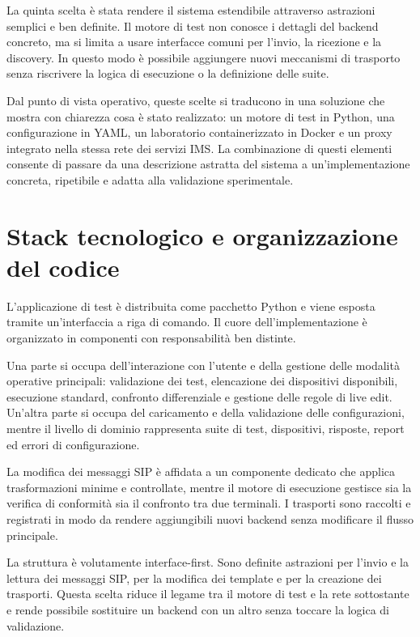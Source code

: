 La quinta scelta \`e stata rendere il sistema estendibile attraverso astrazioni semplici e ben definite. Il motore di test non conosce i dettagli del backend concreto, ma si limita a usare interfacce comuni per l'invio, la ricezione e la discovery. In questo modo \`e possibile aggiungere nuovi meccanismi di trasporto senza riscrivere la logica di esecuzione o la definizione delle suite.

Dal punto di vista operativo, queste scelte si traducono in una soluzione che mostra con chiarezza cosa \`e stato realizzato: un motore di test in Python, una configurazione in YAML, un laboratorio containerizzato in Docker e un proxy integrato nella stessa rete dei servizi IMS. La combinazione di questi elementi consente di passare da una descrizione astratta del sistema a un'implementazione concreta, ripetibile e adatta alla validazione sperimentale.

\section{Stack tecnologico e organizzazione del codice}

L'applicazione di test \`e distribuita come pacchetto Python e viene esposta tramite un'interfaccia a riga di comando. Il cuore dell'implementazione \`e organizzato in componenti con responsabilit\`a ben distinte.

Una parte si occupa dell'interazione con l'utente e della gestione delle modalit\`a operative principali: validazione dei test, elencazione dei dispositivi disponibili, esecuzione standard, confronto differenziale e gestione delle regole di live edit. Un'altra parte si occupa del caricamento e della validazione delle configurazioni, mentre il livello di dominio rappresenta suite di test, dispositivi, risposte, report ed errori di configurazione.

La modifica dei messaggi SIP \`e affidata a un componente dedicato che applica trasformazioni minime e controllate, mentre il motore di esecuzione gestisce sia la verifica di conformit\`a sia il confronto tra due terminali. I trasporti sono raccolti e registrati in modo da rendere aggiungibili nuovi backend senza modificare il flusso principale.

La struttura \`e volutamente interface-first. Sono definite astrazioni per l'invio e la lettura dei messaggi SIP, per la modifica dei template e per la creazione dei trasporti. Questa scelta riduce il legame tra il motore di test e la rete sottostante e rende possibile sostituire un backend con un altro senza toccare la logica di validazione.

